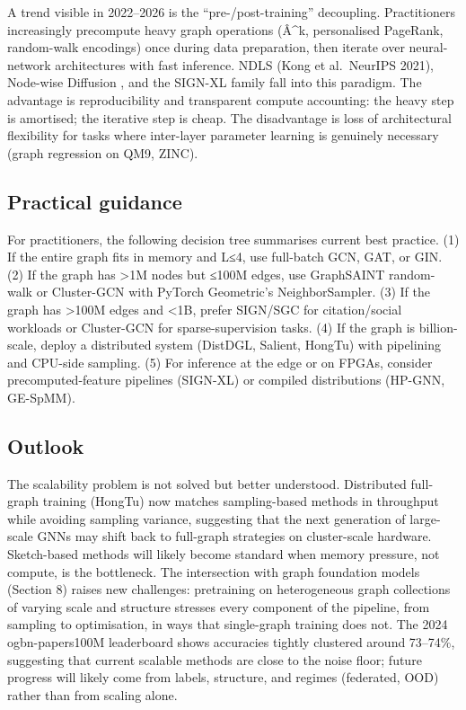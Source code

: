 \documentclass{article}
\begin{document}
A trend visible in 2022--2026 is the ``pre-/post-training'' decoupling. Practitioners increasingly precompute heavy graph operations (Â\^{}k, personalised PageRank, random-walk encodings) once during data preparation, then iterate over neural-network architectures with fast inference. NDLS (Kong et al.~NeurIPS 2021), Node-wise Diffusion \citep{huang2023temporalgraphbench}, and the SIGN-XL family fall into this paradigm. The advantage is reproducibility and transparent compute accounting: the heavy step is amortised; the iterative step is cheap. The disadvantage is loss of architectural flexibility for tasks where inter-layer parameter learning is genuinely necessary (graph regression on QM9, ZINC).

\subsection{Practical guidance}\label{practical-guidance-1}

For practitioners, the following decision tree summarises current best practice. (1) If the entire graph fits in memory and L≤4, use full-batch GCN, GAT, or GIN. (2) If the graph has \textgreater1M nodes but ≤100M edges, use GraphSAINT random-walk or Cluster-GCN with PyTorch Geometric's NeighborSampler. (3) If the graph has \textgreater100M edges and \textless1B, prefer SIGN/SGC for citation/social workloads or Cluster-GCN for sparse-supervision tasks. (4) If the graph is billion-scale, deploy a distributed system (DistDGL, Salient, HongTu) with pipelining and CPU-side sampling. (5) For inference at the edge or on FPGAs, consider precomputed-feature pipelines (SIGN-XL) or compiled distributions (HP-GNN, GE-SpMM).

\subsection{Outlook}\label{outlook-1}

The scalability problem is not solved but better understood. Distributed full-graph training (HongTu) now matches sampling-based methods in throughput while avoiding sampling variance, suggesting that the next generation of large-scale GNNs may shift back to full-graph strategies on cluster-scale hardware. Sketch-based methods will likely become standard when memory pressure, not compute, is the bottleneck. The intersection with graph foundation models (Section 8) raises new challenges: pretraining on heterogeneous graph collections of varying scale and structure stresses every component of the pipeline, from sampling to optimisation, in ways that single-graph training does not. The 2024 ogbn-papers100M leaderboard shows accuracies tightly clustered around 73--74\%, suggesting that current scalable methods are close to the noise floor; future progress will likely come from labels, structure, and regimes (federated, OOD) rather than from scaling alone.
\end{document}
